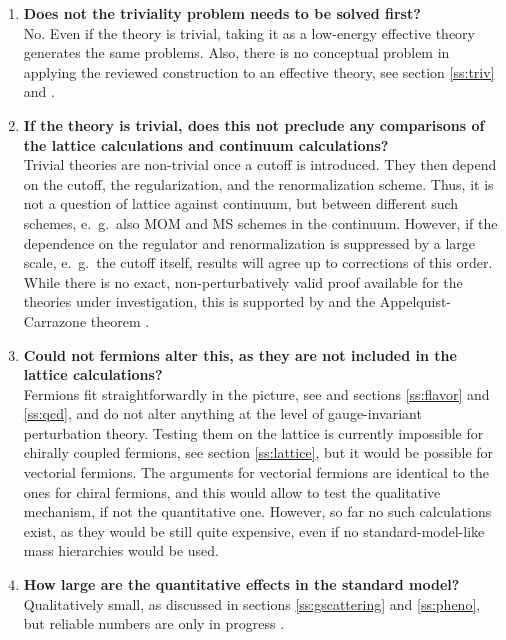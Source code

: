 \documentclass[final,12pt]{article}
\newcommand*{\1}{1\!\!\!\bot}
\begin{document}
\begin{enumerate}
 \item {\bf Does not the triviality problem needs to be solved first?}\\
 No. Even if the theory is trivial, taking it as a low-energy effective theory generates the same problems. Also, there is no conceptual problem in applying the reviewed construction to an effective theory, see section \ref{ss:triv} and \cite{Hasenfratz:1986za,ZinnJustin:2002ru}.
 
 \item {\bf If the theory is trivial, does this not preclude any comparisons of the lattice calculations and continuum calculations?}\\
 Trivial theories are non-trivial once a cutoff is introduced. They then depend on the cutoff, the regularization, and the renormalization scheme. Thus, it is not a question of lattice against continuum, but between different such schemes, e.\ g.\ also MOM and MS schemes in the continuum. However, if the dependence on the regulator and renormalization is suppressed by a large scale, e.\ g.\ the cutoff itself, results will agree up to corrections of this order. While there is no exact, non-perturbatively valid proof available for the theories under investigation, this is supported by \cite{Hasenfratz:1986za} and the Appelquist-Carrazone theorem \cite{BeiglboCk:2006lfa}.
 
 \item {\bf Could not fermions alter this, as they are not included in the lattice calculations?}\\
 Fermions fit straightforwardly in the picture, see \cite{Frohlich:1981yi} and sections \ref{ss:flavor} and \ref{ss:qcd}, and do not alter anything at the level of gauge-invariant perturbation theory. Testing them on the lattice is currently impossible for chirally coupled fermions, see section \ref{ss:lattice}, but it would be possible for vectorial fermions. The arguments for vectorial fermions are identical to the ones for chiral fermions, and this would allow to test the qualitative mechanism, if not the quantitative one. However, so far no such calculations exist, as they would be still quite expensive, even if no standard-model-like mass hierarchies would be used.
 
 \item {\bf How large are the quantitative effects in the standard model?}\\
 Qualitatively small, as discussed in sections \ref{ss:gscattering} and \ref{ss:pheno}, but reliable numbers are only in progress \cite{Egger:2017tkd,Maas:unpublished,Raubitzek:unpublished,Fernbach:unpublished}.
 

\end{enumerate}
\end{document}
